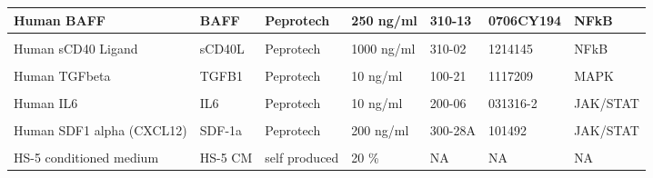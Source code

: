 \documentclass[11pt, a4paper, twosided]{book}
\begin{document}
\begin{table}
{\begin{tabular}[t]{l|l|l|l|l|l|l}
\hline
Human BAFF & BAFF & Peprotech & 250 ng/ml & 310-13 & 0706CY194 & NFkB\\
\hline
\cellcolor[HTML]{E2E868}{Human IL-1 beta} & \cellcolor[HTML]{E2E868}{IL1b} & \cellcolor[HTML]{E2E868}{Peprotech} & \cellcolor[HTML]{E2E868}{10 ng/ml} & \cellcolor[HTML]{E2E868}{200-01} & \cellcolor[HTML]{E2E868}{0606B95} & \cellcolor[HTML]{E2E868}{NFkB}\\
\hline
Human sCD40 Ligand & sCD40L & Peprotech & 1000 ng/ml & 310-02 & 1214145 & NFkB\\
\hline
\cellcolor[HTML]{E2E868}{Goat F(AB')2 Fragment to human IgM} & \cellcolor[HTML]{E2E868}{soluble anti-IgM} & \cellcolor[HTML]{E2E868}{MP Biomedicals} & \cellcolor[HTML]{E2E868}{20000 ng/ml} & \cellcolor[HTML]{E2E868}{55055} & \cellcolor[HTML]{E2E868}{7227} & \cellcolor[HTML]{E2E868}{BCR}\\
\hline
Human TGFbeta & TGFB1 & Peprotech & 10 ng/ml & 100-21 & 1117209 & MAPK\\
\hline
\cellcolor[HTML]{E2E868}{Human IL15} & \cellcolor[HTML]{E2E868}{IL15} & \cellcolor[HTML]{E2E868}{Peprotech} & \cellcolor[HTML]{E2E868}{10 ng/ml} & \cellcolor[HTML]{E2E868}{200-15} & \cellcolor[HTML]{E2E868}{91624} & \cellcolor[HTML]{E2E868}{JAK/STAT}\\
\hline
Human IL6 & IL6 & Peprotech & 10 ng/ml & 200-06 & 031316-2 & JAK/STAT\\
\hline
\cellcolor[HTML]{E2E868}{ODN 2006 (ODN 7909)} & \cellcolor[HTML]{E2E868}{CpG ODN} & \cellcolor[HTML]{E2E868}{Invivogen} & \cellcolor[HTML]{E2E868}{1000 ng/ml} & \cellcolor[HTML]{E2E868}{tlrl-2006-1} & \cellcolor[HTML]{E2E868}{3901-09T} & \cellcolor[HTML]{E2E868}{TLR 9}\\
\hline
Human SDF1 alpha (CXCL12) & SDF-1a & Peprotech & 200 ng/ml & 300-28A & 101492 & JAK/STAT\\
\hline
\cellcolor[HTML]{E2E868}{Human Interferon gamma} & \cellcolor[HTML]{E2E868}{Interferon gamma} & \cellcolor[HTML]{E2E868}{Peprotech} & \cellcolor[HTML]{E2E868}{5 ng/ml} & \cellcolor[HTML]{E2E868}{300-02} & \cellcolor[HTML]{E2E868}{121527} & \cellcolor[HTML]{E2E868}{NFkB}\\
\hline
HS-5 conditioned medium & HS-5 CM & self produced & 20 \% & NA & NA & NA\\
\hline
\end{tabular}}
\end{table}
\end{document}

